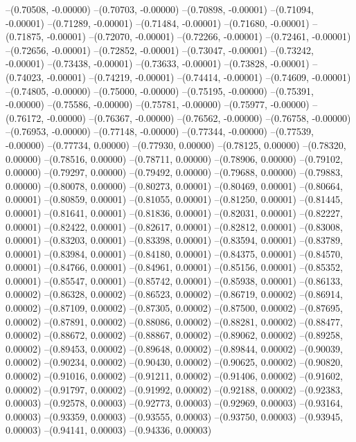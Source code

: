 --(0.70508, -0.00000)
--(0.70703, -0.00000)
--(0.70898, -0.00001)
--(0.71094, -0.00001)
--(0.71289, -0.00001)
--(0.71484, -0.00001)
--(0.71680, -0.00001)
--(0.71875, -0.00001)
--(0.72070, -0.00001)
--(0.72266, -0.00001)
--(0.72461, -0.00001)
--(0.72656, -0.00001)
--(0.72852, -0.00001)
--(0.73047, -0.00001)
--(0.73242, -0.00001)
--(0.73438, -0.00001)
--(0.73633, -0.00001)
--(0.73828, -0.00001)
--(0.74023, -0.00001)
--(0.74219, -0.00001)
--(0.74414, -0.00001)
--(0.74609, -0.00001)
--(0.74805, -0.00000)
--(0.75000, -0.00000)
--(0.75195, -0.00000)
--(0.75391, -0.00000)
--(0.75586, -0.00000)
--(0.75781, -0.00000)
--(0.75977, -0.00000)
--(0.76172, -0.00000)
--(0.76367, -0.00000)
--(0.76562, -0.00000)
--(0.76758, -0.00000)
--(0.76953, -0.00000)
--(0.77148, -0.00000)
--(0.77344, -0.00000)
--(0.77539, -0.00000)
--(0.77734, 0.00000)
--(0.77930, 0.00000)
--(0.78125, 0.00000)
--(0.78320, 0.00000)
--(0.78516, 0.00000)
--(0.78711, 0.00000)
--(0.78906, 0.00000)
--(0.79102, 0.00000)
--(0.79297, 0.00000)
--(0.79492, 0.00000)
--(0.79688, 0.00000)
--(0.79883, 0.00000)
--(0.80078, 0.00000)
--(0.80273, 0.00001)
--(0.80469, 0.00001)
--(0.80664, 0.00001)
--(0.80859, 0.00001)
--(0.81055, 0.00001)
--(0.81250, 0.00001)
--(0.81445, 0.00001)
--(0.81641, 0.00001)
--(0.81836, 0.00001)
--(0.82031, 0.00001)
--(0.82227, 0.00001)
--(0.82422, 0.00001)
--(0.82617, 0.00001)
--(0.82812, 0.00001)
--(0.83008, 0.00001)
--(0.83203, 0.00001)
--(0.83398, 0.00001)
--(0.83594, 0.00001)
--(0.83789, 0.00001)
--(0.83984, 0.00001)
--(0.84180, 0.00001)
--(0.84375, 0.00001)
--(0.84570, 0.00001)
--(0.84766, 0.00001)
--(0.84961, 0.00001)
--(0.85156, 0.00001)
--(0.85352, 0.00001)
--(0.85547, 0.00001)
--(0.85742, 0.00001)
--(0.85938, 0.00001)
--(0.86133, 0.00002)
--(0.86328, 0.00002)
--(0.86523, 0.00002)
--(0.86719, 0.00002)
--(0.86914, 0.00002)
--(0.87109, 0.00002)
--(0.87305, 0.00002)
--(0.87500, 0.00002)
--(0.87695, 0.00002)
--(0.87891, 0.00002)
--(0.88086, 0.00002)
--(0.88281, 0.00002)
--(0.88477, 0.00002)
--(0.88672, 0.00002)
--(0.88867, 0.00002)
--(0.89062, 0.00002)
--(0.89258, 0.00002)
--(0.89453, 0.00002)
--(0.89648, 0.00002)
--(0.89844, 0.00002)
--(0.90039, 0.00002)
--(0.90234, 0.00002)
--(0.90430, 0.00002)
--(0.90625, 0.00002)
--(0.90820, 0.00002)
--(0.91016, 0.00002)
--(0.91211, 0.00002)
--(0.91406, 0.00002)
--(0.91602, 0.00002)
--(0.91797, 0.00002)
--(0.91992, 0.00002)
--(0.92188, 0.00002)
--(0.92383, 0.00003)
--(0.92578, 0.00003)
--(0.92773, 0.00003)
--(0.92969, 0.00003)
--(0.93164, 0.00003)
--(0.93359, 0.00003)
--(0.93555, 0.00003)
--(0.93750, 0.00003)
--(0.93945, 0.00003)
--(0.94141, 0.00003)
--(0.94336, 0.00003)
